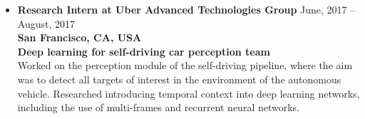 \documentclass[10pt,letterpaper]{article}
\newcommand{\thing}[2]{{#1} \hfill {#2}}
\begin{document}
\begin{itemize}
\item \thing{\bf Research Intern at Uber Advanced Technologies Group}{June, 2017 -- August, 2017}\\
        {\bf San Francisco, CA, USA} \\
        {\bf Deep learning for self-driving car perception team}\vspace{0.5em}\\
        Worked on the perception module of the self-driving pipeline, where the aim was to detect all targets of interest in the environment of the autonomous vehicle. Researched introducing temporal context into deep learning networks, including the use of multi-frames and recurrent neural networks.
	

\end{itemize}

\vspace{-1.8em}
\end{document}
